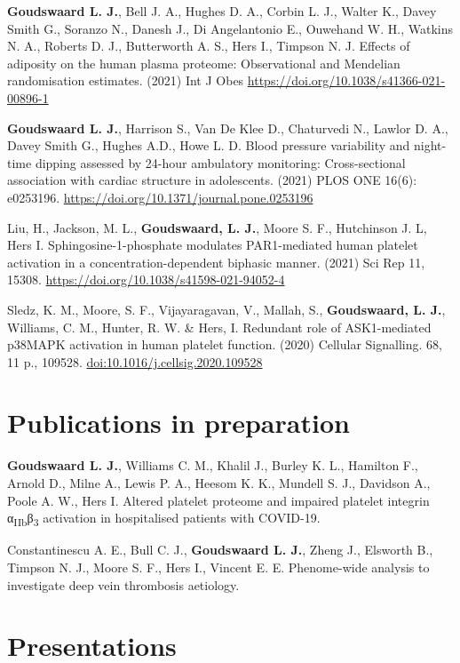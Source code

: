 \documentclass[11pt,twoside]{bristolthesis}
\begin{document}
\textbf{Goudswaard L. J.}, Bell J. A., Hughes D. A., Corbin L. J., Walter K., Davey Smith G., Soranzo N., Danesh J., Di Angelantonio E., Ouwehand W. H., Watkins N. A., Roberts D. J., Butterworth A. S., Hers I., Timpson N. J. Effects of adiposity on the human plasma proteome: Observational and Mendelian randomisation estimates. (2021) Int J Obes \url{https://doi.org/10.1038/s41366-021-00896-1}

\textbf{Goudswaard L. J.}, Harrison S., Van De Klee D., Chaturvedi N., Lawlor D. A., Davey Smith G., Hughes A.D., Howe L. D. Blood pressure variability and night-time dipping assessed by 24-hour ambulatory monitoring: Cross-sectional association with cardiac structure in adolescents. (2021) PLOS ONE 16(6): e0253196. \url{https://doi.org/10.1371/journal.pone.0253196}

Liu, H., Jackson, M. L., \textbf{Goudswaard, L. J.}, Moore S. F., Hutchinson J. L, Hers I. Sphingosine-1-phosphate modulates PAR1-mediated human platelet activation in a concentration-dependent biphasic manner. (2021) Sci Rep 11, 15308. \url{https://doi.org/10.1038/s41598-021-94052-4}

Sledz, K. M., Moore, S. F., Vijayaragavan, V., Mallah, S., \textbf{Goudswaard, L. J.}, Williams, C. M., Hunter, R. W. \& Hers, I. Redundant role of ASK1-mediated p38MAPK activation in human platelet function. (2020) Cellular Signalling. 68, 11 p., 109528. \url{doi:10.1016/j.cellsig.2020.109528}

\hypertarget{publications-in-preparation}{%
\section{Publications in preparation}\label{publications-in-preparation}}

\textbf{Goudswaard L. J.}, Williams C. M., Khalil J., Burley K. L., Hamilton F., Arnold D., Milne A., Lewis P. A., Heesom K. K., Mundell S. J., Davidson A., Poole A. W., Hers I. Altered platelet proteome and impaired platelet integrin α\textsubscript{IIb}β\textsubscript{3} activation in hospitalised patients with COVID-19.

Constantinescu A. E., Bull C. J., \textbf{Goudswaard L. J.}, Zheng J., Elsworth B., Timpson N. J., Moore S. F., Hers I., Vincent E. E. Phenome-wide analysis to investigate deep vein thrombosis aetiology.

\hypertarget{presentations}{%
\section{Presentations}\label{presentations}}
\end{document}

